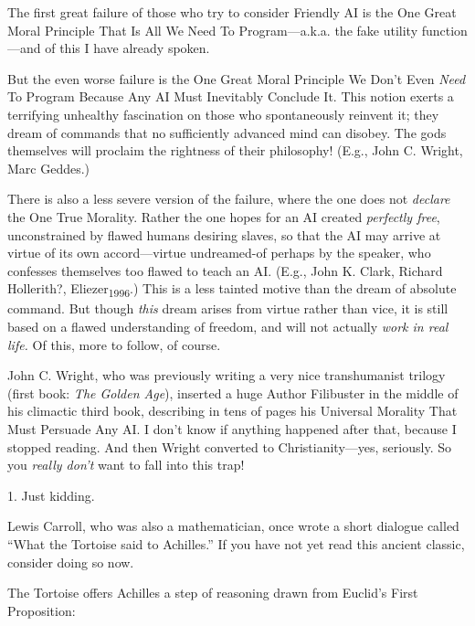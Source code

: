 {
 The first great failure of those who try to consider Friendly AI
is the One Great Moral Principle That Is All We Need To
Program---a.k.a. the fake utility function---and of this I have already
spoken.}

{
 But the even worse failure is the One Great Moral Principle We
Don't Even \textit{Need} To Program Because Any AI Must
Inevitably Conclude It. This notion exerts a terrifying unhealthy
fascination on those who spontaneously reinvent it; they dream of
commands that no sufficiently advanced mind can disobey. The gods
themselves will proclaim the rightness of their philosophy! (E.g., John
C. Wright, Marc Geddes.)}

{
 There is also a less severe version of the failure, where the one
does not \textit{declare} the One True Morality. Rather the one hopes
for an AI created \textit{perfectly free}, unconstrained by flawed
humans desiring slaves, so that the AI may arrive at virtue of its own
accord---virtue undreamed-of perhaps by the speaker, who confesses
themselves too flawed to teach an AI. (E.g., John K. Clark, Richard
Hollerith?, Eliezer\textsubscript{1996}.) This is a less tainted motive
than the dream of absolute command. But though \textit{this} dream
arises from virtue rather than vice, it is still based on a flawed
understanding of freedom, and will not actually \textit{work in real
life.} Of this, more to follow, of course.}

{
 John C. Wright, who was previously writing a very nice
transhumanist trilogy (first book: \textit{The Golden Age}), inserted a
huge Author Filibuster in the middle of his climactic third book,
describing in tens of pages his Universal Morality That Must Persuade
Any AI. I don't know if anything happened after that,
because I stopped reading. And then Wright converted to
Christianity---yes, seriously. So you \textit{really
don't} want to fall into this trap!}

\myendsectiontext


\bigskip

{
 1. Just kidding.}


{
 Lewis Carroll, who was also a mathematician, once wrote a short
dialogue called ``What the Tortoise said to
Achilles.'' If you have not yet read this ancient
classic, consider doing so now. }

{
 The Tortoise offers Achilles a step of reasoning drawn from
Euclid's First Proposition:}

